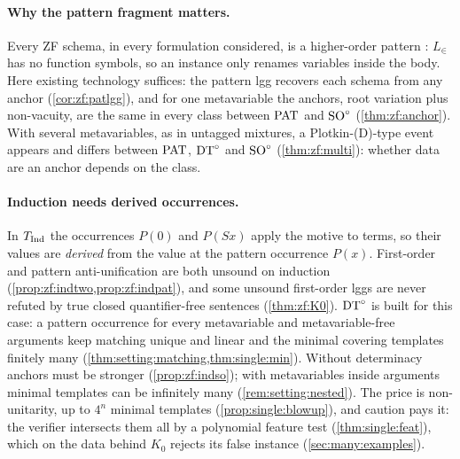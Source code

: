 \paragraph{Why the pattern fragment matters.}
Every ZF schema, in every formulation considered, is a higher-order pattern \citep{miller1991logic}: $L_\in$ has no
function symbols, so an instance only renames variables inside the body. Here existing technology suffices: the pattern
lgg recovers each schema from any anchor (\cref{cor:zf:patlgg}), and for one metavariable the anchors, root variation
plus non-vacuity, are the same in every class between $\mathrm{PAT}$ and $\mathrm{SO}^{\circ}$ (\cref{thm:zf:anchor}). With several
metavariables, as in untagged mixtures, a Plotkin-(D)-type event appears and differs between $\mathrm{PAT}$, $\mathrm{DT}^{\circ}$ and $\mathrm{SO}^{\circ}$
(\cref{thm:zf:multi}): whether data are an anchor depends on the class.

\paragraph{Induction needs derived occurrences.}
In $T_{\mathrm{Ind}}$ the occurrences $P(0)$ and $P(Sx)$ apply the motive to terms, so their values are \emph{derived} from the
value at the pattern occurrence $P(x)$. First-order and pattern anti-unification are both unsound on induction
(\cref{prop:zf:indtwo,prop:zf:indpat}), and some unsound first-order lggs are never refuted by true closed
quantifier-free sentences (\cref{thm:zf:K0}). $\mathrm{DT}^{\circ}$ is built for this case: a pattern occurrence for every metavariable
and metavariable-free arguments keep matching unique and linear and the minimal covering templates finitely many
(\cref{thm:setting:matching,thm:single:min}). Without determinacy anchors must be stronger (\cref{prop:zf:indso}); with
metavariables inside arguments minimal templates can be infinitely many (\cref{rem:setting:nested}). The price is
non-unitarity, up to $4^n$ minimal templates (\cref{prop:single:blowup}), and caution pays it: the verifier intersects
them all by a polynomial feature test (\cref{thm:single:feat}), which on the data behind $K_0$ rejects its false
instance (\cref{sec:many:examples}).

